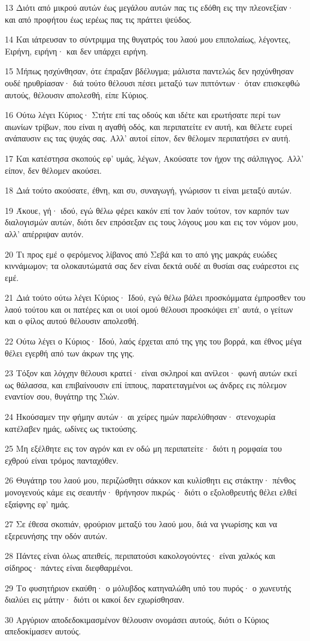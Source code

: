 \par 13 Διότι από μικρού αυτών έως μεγάλου αυτών πας τις εδόθη εις την πλεονεξίαν· και από προφήτου έως ιερέως πας τις πράττει ψεύδος.
\par 14 Και ιάτρευσαν το σύντριμμα της θυγατρός του λαού μου επιπολαίως, λέγοντες, Ειρήνη, ειρήνη· και δεν υπάρχει ειρήνη.
\par 15 Μήπως ησχύνθησαν, ότε έπραξαν βδέλυγμα; μάλιστα παντελώς δεν ησχύνθησαν ουδέ ηρυθρίασαν· διά τούτο θέλουσι πέσει μεταξύ των πιπτόντων· όταν επισκεφθώ αυτούς, θέλουσιν απολεσθή, είπε Κύριος.
\par 16 Ούτω λέγει Κύριος· Στήτε επί τας οδούς και ιδέτε και ερωτήσατε περί των αιωνίων τρίβων, που είναι η αγαθή οδός, και περιπατείτε εν αυτή, και θέλετε ευρεί ανάπαυσιν εις τας ψυχάς σας. Αλλ' αυτοί είπον, δεν θέλομεν περιπατήσει εν αυτή.
\par 17 Και κατέστησα σκοπούς εφ' υμάς, λέγων, Ακούσατε τον ήχον της σάλπιγγος. Αλλ' είπον, δεν θέλομεν ακούσει.
\par 18 Διά τούτο ακούσατε, έθνη, και συ, συναγωγή, γνώρισον τι είναι μεταξύ αυτών.
\par 19 Άκουε, γή· ιδού, εγώ θέλω φέρει κακόν επί τον λαόν τούτον, τον καρπόν των διαλογισμών αυτών, διότι δεν επρόσεξαν εις τους λόγους μου και εις τον νόμον μου, αλλ' απέρριψαν αυτόν.
\par 20 Τι προς εμέ ο φερόμενος λίβανος από Σεβά και το από γης μακράς ευώδες κιννάμωμον; τα ολοκαυτώματά σας δεν είναι δεκτά ουδέ αι θυσίαι σας ευάρεστοι εις εμέ.
\par 21 Διά τούτο ούτω λέγει Κύριος· Ιδού, εγώ θέλω βάλει προσκόμματα έμπροσθεν του λαού τούτου και οι πατέρες και οι υιοί ομού θέλουσι προσκόψει επ' αυτά, ο γείτων και ο φίλος αυτού θέλουσιν απολεσθή.
\par 22 Ούτω λέγει ο Κύριος· Ιδού, λαός έρχεται από της γης του βορρά, και έθνος μέγα θέλει εγερθή από των άκρων της γης.
\par 23 Τόξον και λόγχην θέλουσι κρατεί· είναι σκληροί και ανίλεοι· φωνή αυτών εκεί ως θάλασσα, και επιβαίνουσιν επί ίππους, παρατεταγμένοι ως άνδρες εις πόλεμον εναντίον σου, θυγάτηρ της Σιών.
\par 24 Ηκούσαμεν την φήμην αυτών· αι χείρες ημών παρελύθησαν· στενοχωρία κατέλαβεν ημάς, ωδίνες ως τικτούσης.
\par 25 Μη εξέλθητε εις τον αγρόν και εν οδώ μη περιπατείτε· διότι η ρομφαία του εχθρού είναι τρόμος πανταχόθεν.
\par 26 Θυγάτηρ του λαού μου, περιζώσθητι σάκκον και κυλίσθητι εις στάκτην· πένθος μονογενούς κάμε εις σεαυτήν· θρήνησον πικρώς· διότι ο εξολοθρευτής θέλει ελθεί εξαίφνης εφ' ημάς.
\par 27 Σε έθεσα σκοπιάν, φρούριον μεταξύ του λαού μου, διά να γνωρίσης και να εξερευνήσης την οδόν αυτών.
\par 28 Πάντες είναι όλως απειθείς, περιπατούσι κακολογούντες· είναι χαλκός και σίδηρος· πάντες είναι διεφθαρμένοι.
\par 29 Το φυσητήριον εκαύθη· ο μόλυβδος κατηναλώθη υπό του πυρός· ο χωνευτής διαλύει εις μάτην· διότι οι κακοί δεν εχωρίσθησαν.
\par 30 Αργύριον αποδεδοκιμασμένον θέλουσιν ονομάσει αυτούς, διότι ο Κύριος απεδοκίμασεν αυτούς.

